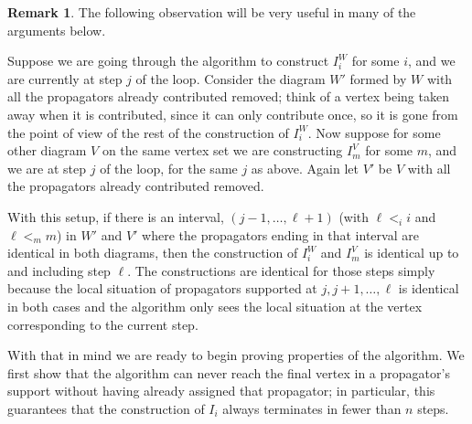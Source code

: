 \documentclass[11pt]{article}
\theoremstyle{remark}
\theoremstyle{definition}
\newtheorem{rmk}[thm]{Remark}
\begin{document}
\begin{rmk}\label{rmk algorithm locally same}
The following observation will be very useful in many of the arguments below.  

Suppose we are going through the algorithm to construct $I_i^W$ for some $i$, and we are currently at step $j$ of the loop.  Consider the diagram $W'$ formed by $W$ with all the propagators already contributed removed; think of a vertex being taken away when it is contributed, since it can only contribute once, so it is gone from the point of view of the rest of the construction of $I_i^W$.  Now suppose for some other diagram $V$ on the same vertex set we are constructing $I_m^V$ for some $m$, and we are at step $j$ of the loop, for the same $j$ as above.  Again let $V'$ be $V$ with all the propagators already contributed removed.

With this setup, if there is an interval, $(j-1, \ldots, \ell+1)$ (with $\ell <_i i$ and $\ell <_m m$) in $W'$ and $V'$ where the propagators ending in that interval are identical in both diagrams, then the construction of $I_i^W$ and $I_m^V$ is identical up to and including step $\ell$.  The constructions are identical for those steps simply because the local situation of propagators supported at $j, j+1, \ldots, \ell$ is identical in both cases and the algorithm only sees the local situation at the vertex corresponding to the current step.
\end{rmk}

With that in mind we are ready to begin proving properties of the algorithm. We first show that the algorithm can never reach the final vertex in a propagator's support without having already assigned that propagator; in particular, this guarantees that the construction of $I_i$ always terminates in fewer than $n$ steps.
\end{document}
